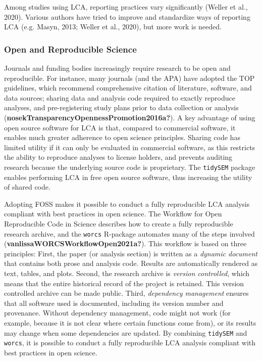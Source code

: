 \documentclass[
  ,man,floatsintext]{apa6}
\begin{document}
Among studies using LCA, reporting practices vary significantly
(Weller et al., 2020). Various authors have tried to improve and
standardize ways of reporting LCA (e.g. Masyn, 2013; Weller et al., 2020), but more work is needed.

\hypertarget{open-and-reproducible-science}{%
\subsubsection{Open and Reproducible Science}\label{open-and-reproducible-science}}

Journals and funding bodies increasingly require research to be open and
reproducible. For instance, many journals (and the APA) have adopted the
TOP guidelines, which recommend comprehensive citation of literature,
software, and data sources; sharing data and analysis code required to
exactly reproduce analyses, and pre-registering study plans prior to
data collection or analysis (\textbf{nosekTransparencyOpennessPromotion2016a?}).
A key advantage of using open source software for LCA is that, compared
to commercial software, it enables much greater adherence to open
science principles. Sharing code has limited utility if it can only be
evaluated in commercial software, as this restricts the ability to
reproduce analyses to license holders, and prevents auditing research
because the underlying source code is proprietary. The \texttt{tidySEM} package
enables performing LCA in free open source software, thus increasing the
utility of shared code.

Adopting FOSS makes it possible to conduct a fully reproducible LCA
analysis compliant with best practices in open science. The Workflow for
Open Reproducible Code in Science describes how to create a fully
reproducible research archive, and the \texttt{worcs} R-package automates many
of the steps involved (\textbf{vanlissaWORCSWorkflowOpen2021a?}).
This workflow is based on three principles: First, the paper (or
analysis section) is written as a \emph{dynamic document} that contains both
prose and analysis code. Results are automatically rendered as text,
tables, and plots. Second, the research archive is \emph{version controlled},
which means that the entire historical record of the project is
retained. This version controlled archive can be made public. Third,
\emph{dependency management} ensures that all software used is documented,
including its version number and provenance. Without dependency
management, code might not work (for example, because it is not clear
where certain functions come from), or its results may change when some
dependencies are updated. By combining \texttt{tidySEM} and \texttt{worcs}, it is
possible to conduct a fully reproducible LCA analysis compliant with
best practices in open science.
\end{document}
